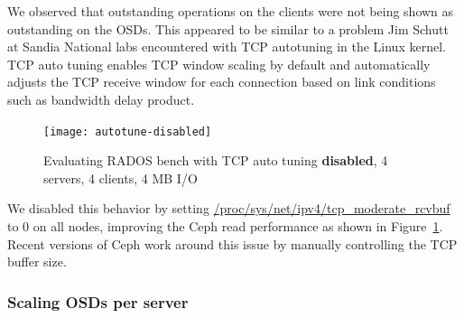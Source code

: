 We observed that outstanding operations on the clients were not being shown as
outstanding on the OSDs.  This appeared to be similar to a problem Jim Schutt
at Sandia National labs encountered with TCP autotuning in the Linux
kernel\cite{Jim:tcptune}. TCP auto tuning enables TCP window scaling by
default and automatically adjusts the TCP receive window for each connection
based on link conditions such as bandwidth delay product. 

\begin{figure}[htb]
\centering
\texttt{[image: autotune-disabled]}
\caption{Evaluating RADOS bench with TCP auto tuning \textbf{disabled},  4 servers, 4
clients, 4 MB I/O}
\label{fig:rados-tcp-autotune-disabled}
\end{figure}

We disabled this behavior by setting 
\url{/proc/sys/net/ipv4/tcp_moderate_rcvbuf} to 0 on all nodes, improving the Ceph read performance as
shown in Figure~\ref{fig:rados-tcp-autotune-disabled}.
Recent versions of Ceph work around this issue by manually controlling the TCP
buffer size.  

\subsubsection{Scaling OSDs per server}


